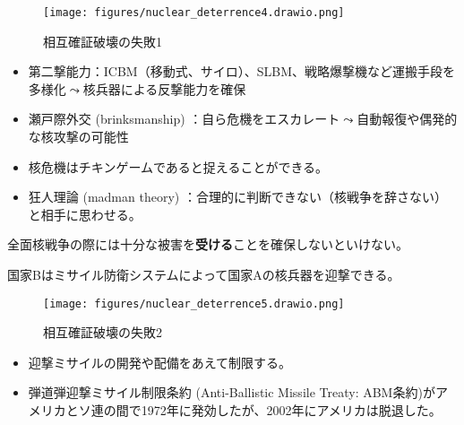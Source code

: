 \documentclass[
  xelatex,
  ja=standard]{bxjsarticle}
\providecommand{\tightlist}{%
  \setlength{\itemsep}{0pt}\setlength{\parskip}{0pt}}\usepackage{longtable,booktabs,array}
\begin{document}
\begin{figure}[htpb]

{\centering \texttt{[image: figures/nuclear\_deterrence4.drawio.png]}

}

\caption{相互確証破壊の失敗1}

\end{figure}

\begin{itemize}
\tightlist
\item
  第二撃能力：ICBM（移動式、サイロ）、SLBM、戦略爆撃機など運搬手段を多様化\(\leadsto\)核兵器による反撃能力を確保
\item
  瀬戸際外交 (brinksmanship)
  ：自ら危機をエスカレート\(\leadsto\)自動報復や偶発的な核攻撃の可能性\citep{schelling2008, schelling2018}
\item
  核危機はチキンゲームであると捉えることができる。
\item
  狂人理論 (madman theory)
  ：合理的に判断できない（核戦争を辞さない）と相手に思わせる。
\end{itemize}

全面核戦争の際には十分な被害を\textbf{受ける}ことを確保しないといけない。

\begin{tcolorbox}[enhanced jigsaw, colbacktitle=quarto-callout-tip-color!10!white, breakable, toptitle=1mm, opacitybacktitle=0.6, leftrule=.75mm, bottomrule=.15mm, title=\textcolor{quarto-callout-tip-color}{\faLightbulb}\hspace{0.5em}{相互確証破壊の失敗2}, titlerule=0mm, bottomtitle=1mm, rightrule=.15mm, arc=.35mm, toprule=.15mm, left=2mm, opacityback=0, coltitle=black, colback=white, colframe=quarto-callout-tip-color-frame]

国家Bはミサイル防衛システムによって国家Aの核兵器を迎撃できる。

\end{tcolorbox}

\begin{figure}[htpb]

{\centering \texttt{[image: figures/nuclear\_deterrence5.drawio.png]}

}

\caption{相互確証破壊の失敗2}

\end{figure}

\begin{itemize}
\tightlist
\item
  迎撃ミサイルの開発や配備をあえて制限する。
\item
  弾道弾迎撃ミサイル制限条約 (Anti-Ballistic Missile Treaty:
  ABM条約)がアメリカとソ連の間で1972年に発効したが、2002年にアメリカは脱退した。
\end{itemize}
\end{document}
